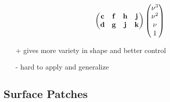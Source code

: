 \documentclass[twocolumn,landscape,10pt]{article}
\theoremstyle{definition}
\begin{document}
\begin{itemize}
\[\begin{pmatrix}
                \mathbf{c} & \mathbf{f} & \mathbf{h} & \mathbf{j} \\
                \mathbf{d} & \mathbf{g} & \mathbf{j} & \mathbf{k}
            \end{pmatrix} 
            \begin{pmatrix}
                \nu^3 \\
                \nu^2 \\
                \nu \\
                1
            \end{pmatrix} \\
        \]
        \begin{itemize}
            \item[+] gives more variety in shape and better control
            \item[-] hard to apply and generalize
        \end{itemize} 
\end{itemize} 

\subsection{Surface Patches}
\end{document}
